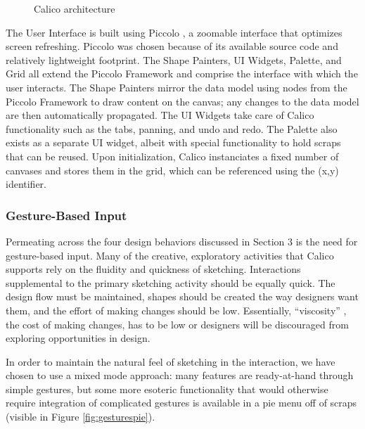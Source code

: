 \begin{figure}
  \centering
 
\caption {Calico architecture}
\label{fig:arch}       %
\end{figure}
%

The User Interface is built using Piccolo \citep{Bederson}, a zoomable interface that optimizes screen refreshing.  Piccolo was chosen because of its available source code and relatively lightweight footprint.  The Shape Painters, UI Widgets, Palette, and Grid all extend the Piccolo Framework and comprise the interface with which the user interacts. The Shape Painters mirror the data model using nodes  from the Piccolo Framework to draw content on the canvas; any changes to the data model are then automatically propagated. The UI Widgets take care of Calico functionality such as the tabs, panning, and undo and redo. The Palette also exists as a separate UI widget, albeit with special functionality to hold scraps that can be reused. Upon initialization, Calico instanciates a fixed number of canvases and stores them in the grid, which can be referenced using the (x,y) identifier. 

\subsubsection {Gesture-Based Input}
\label{calico:5}

Permeating across the four design behaviors discussed in Section 3 is the need for gesture-based input. Many of the creative, exploratory activities that Calico supports rely on the fluidity and quickness of sketching. Interactions supplemental to the primary sketching activity should be equally quick. The design flow must be maintained, shapes should be created the way designers want them, and the effort of making changes should be low. Essentially, ``viscosity'' \citep{petre2009insights}, the cost of making changes, has to be low or designers will be discouraged from exploring opportunities in design. 

In order to maintain the natural feel of sketching in the interaction, we have chosen to use a mixed mode approach: many features are ready-at-hand through simple gestures, but some more esoteric functionality that would otherwise require integration of complicated gestures is available in a pie menu off of scraps (visible in Figure \ref{fig:gesturespie}).

